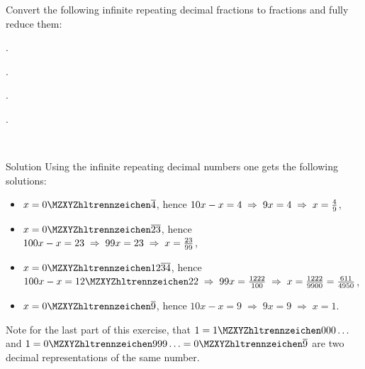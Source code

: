 \begin{MExercises}
\begin{MExercise}
Convert the following infinite repeating decimal fractions to fractions and fully reduce them:
\begin{MExerciseItems}
\item{.}
\item{.}
\item{.}
\item{.}
\end{MExerciseItems}
\end{MExercise}
\ \\
\begin{MHint}{Solution}
Using the  infinite repeating decimal numbers one gets the following solutions:
\begin{itemize}
\item{$x=\MZahl{0}{}\overline{4}$, hence $\displaystyle 10x-x=4\;\Rightarrow\;9x=4\;\Rightarrow\;x=\tfrac{4}{9}$,}
\item{$x=\MZahl{0}{}\overline{23}$, hence $\displaystyle 100x-x=23\;\Rightarrow\;99x=23\;\Rightarrow\; x=\tfrac{23}{99}$,}
\item{$x=\MZahl{0}{12}\overline{34}$, hence $\displaystyle 100x-x=\MZahl{12}{22}\;\Rightarrow\;99x=\Mtfrac{1222}{100}\;\Rightarrow\;x=\Mtfrac{1222}{9900}=\Mtfrac{611}{4950}$,}
\item{$x=\MZahl{0}{}\overline{9}$, hence $\displaystyle 10x-x=9\;\Rightarrow\;9x=9\;\Rightarrow\;x=1$.}
 \end{itemize}
 Note for the last part of this exercise, that $1=\MZahl{1}{000}\ldots$ and $1=\MZahl{0}{999}\ldots=\MZahl{0}{}\overline{9}$
are two decimal representations of the same number.
\end{MHint}
\end{MExercises}



